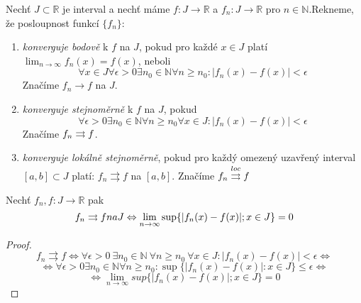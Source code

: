\begin{definice}
Nechť $J \subset \mathbb{R}$ je interval a nechť máme $f : J \rightarrow \mathbb{R}$ a $f_n : J \rightarrow \mathbb{R}$ pro $n \in \mathbb{N}$.Rekneme, že posloupnost funkcí $\{f_n\}$:

\begin{enumerate}
\item \emph{konverguje bodově} k $f$ na $J$, pokud pro každé $x \in J$ platí $\lim_{n \rightarrow \infty} f_n(x) = f(x)$, neboli
$$\forall x \in J \forall \epsilon > 0 \exists n_0 \in \mathbb{N} \forall n \geq n_0 : |f_n(x) - f(x)| < \epsilon$$
Značíme $f_n \rightarrow f$ na $J$.
\item \emph{konverguje stejnoměrně} k $f$ na $J$, pokud
$$\forall \epsilon > 0 \exists n_0 \in \mathbb{N} \forall n \geq n_0 \forall x \in J : | f_n(x) - f(x) | < \epsilon$$
Značíme $f_n \rightrightarrows f$.
\item \emph{konverguje lokálně stejnoměrně}, pokud pro každý omezený uzavřený interval $[a, b] \subset J$ platí: $f_n \rightrightarrows f$ na $[a, b]$. Značíme $f_n \overset{loc}{\rightrightarrows} f$
\end{enumerate}
\end{definice}

\begin{vetal}
Nechť $f_n, f:J \rightarrow \mathbb{R}$ pak
$$f_n \rightrightarrows f na J \Leftrightarrow \lim_{n \rightarrow \infty} \sup \{ |f_n(x) - f(x)|; x \in J \} = 0$$
\end{vetal}
\begin{proof}
$$ f_n \rightrightarrows f \Leftrightarrow \forall \epsilon > 0 \  \exists n_0 \in \mathbb{N} \  \forall n \geq n_0 \  \forall x \in J: |f_n(x) - f(x)| < \epsilon \Leftrightarrow$$
$$\Leftrightarrow \forall \epsilon > 0 \exists n_0 \in \mathbb{N} \forall n \geq n_0 : \sup \{ |f_n(x) - f(x) | : x \in J \} \leq \epsilon \Leftrightarrow$$
$$\Leftrightarrow \lim_{n \to \infty} sup\{|f_n(x)-f(x)|;x \in J\} = 0$$
\end{proof}

